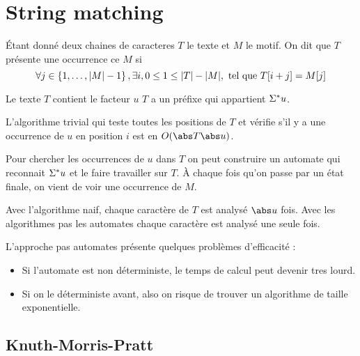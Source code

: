 \section{String matching}


\begin{definition}
	Étant donné deux chaines de caracteres $T$ le texte et $M$ le motif.
	On dit que $T$ présente une occurrence ce $M$ si
	$$\forall j \in \left\{1,\ldots,|M| -1\right\}, \exists i, 0 \leq 1 \leq |T| - |M|, \text{ tel que } T[i + j] = M[j]$$
\end{definition}

\begin{remarque}
	Le texte $T$ contient le facteur $u$ \ssi $T$ a un préfixe qui appartient $\Sigma^{*} u$.
\end{remarque}

\begin{remarque}
	L'algorithme trivial qui teste toutes les positions de $T$ et vérifie s'il y a une occurrence de $u$ en position $i$ est en $O(\abs T \abs u)$.
\end{remarque}

\begin{remarque}
	Pour chercher les occurrences de $u$ dans $T$ on peut construire un automate qui reconnait $\Sigma^{*} u$ et le faire travailler sur $T$.
	À chaque fois qu'on passe par un état finale, on vient de voir une occurrence de $M$.
\end{remarque}

\begin{remarque}
	Avec l'algorithme naif, chaque caractère de $T$ est analysé $\abs u$ fois. Avec les algorithmes pas les automates chaque caractère est analysé une seule fois.
\end{remarque}

\begin{remarque}
	L'approche pas automates présente quelques problèmes d'efficacité :
	\begin{itemize}
		\item Si l'automate est non déterministe, le temps de calcul peut devenir tres lourd.
		\item Si on le déterministe avant, also on risque de trouver un algorithme de taille exponentielle.
	\end{itemize}
\end{remarque}

\subsection{Knuth-Morris-Pratt}

